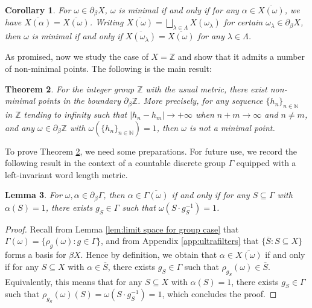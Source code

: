 \documentclass[12pt, a4paper]{amsart}
\numberwithin{equation}{section}
\newtheorem{thm}{Theorem}[section]
\newtheorem{cor}[thm]{Corollary}
\newtheorem{lem}[thm]{Lemma}
\theoremstyle{definition}
\theoremstyle{remark}
\def\NN{\mathbb{N}}
\def\ZZ{\mathbb{Z}}
\begin{document}
\begin{cor}\label{cor:char for min point}
For $\omega \in \partial_\beta X$, $\omega$ is minimal \emph{if and only if} for any $\alpha \in \overline{X(\omega)}$, we have $\overline{X(\alpha)} = \overline{X(\omega)}$. Writing $\overline{X(\omega)} = \bigsqcup_{\lambda \in \Lambda}X(\omega_\lambda)$ for certain $\omega_\lambda \in \partial_\beta X$, then $\omega$ is minimal \emph{if and only if} $\overline{X(\omega_\lambda)} = \overline{X(\omega)}$ for any $\lambda \in \Lambda$.
\end{cor}


As promised, now we study the case of $X=\ZZ$ and show that it admits a number of non-minimal points. The following is the main result:

\begin{thm}\label{thm:non-min point for Z}
For the integer group $\ZZ$ with the usual metric, there exist non-minimal points in the boundary $\partial_\beta \ZZ$. More precisely, for any sequence $\{h_n\}_{n\in \NN}$ in $\ZZ$ tending to infinity such that $|h_n -h_m| \to +\infty$ when $n+m \to \infty$ and $n\neq m$, and any $\omega \in \partial_\beta \ZZ$ with $\omega(\{h_n\}_{n\in \NN})=1$, then $\omega$ is \emph{not} a minimal point.
\end{thm}


To prove Theorem \ref{thm:non-min point for Z}, we need some preparations. For future use, we record the following result in the context of a countable discrete group $\Gamma$ equipped with a left-invariant word length metric.

\begin{lem}\label{lem:char for closure of limit space}
For $\omega, \alpha \in \partial_\beta \Gamma$, then $\alpha \in \overline{\Gamma(\omega)}$ \emph{if and only if} for any $S \subseteq \Gamma$ with $\alpha(S)=1$, there exists $g_S \in \Gamma$ such that $\omega(S \cdot g_S^{-1}) =1$.
\end{lem}

\begin{proof}
Recall from Lemma \ref{lem:limit space for group case} that $\Gamma(\omega) = \{\rho_g(\omega): g\in \Gamma\}$, and from Appendix \ref{app:ultrafilters} that $\{\overline{S}: S \subseteq X\}$ forms a basis for $\beta X$. Hence by definition, we obtain that $\alpha \in \overline{X(\omega)}$ if and only if for any $S \subseteq X$ with $\alpha \in \overline{S}$, there exists $g_S \in \Gamma$ such that $\rho_{g_S}(\omega) \in \overline{S}$. Equivalently, this means that for any $S \subseteq X$ with $\alpha(S)=1$, there exists $g_S \in \Gamma$ such that $\rho_{g_S}(\omega)(S) = \omega(S \cdot g_S^{-1}) =1$, which concludes the proof.
\end{proof}
\end{document}
